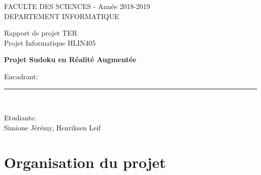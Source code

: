\documentclass[8pt, french]{article}
\begin{document}
\begin{titlepage}

\begin{center}
\vspace*{-1in}
\begin{figure}[htb]
\begin{center}
\end{center}
\end{figure}

FACULTE DES SCIENCES - Année 2018-2019\\
\vspace*{0.15in}
DEPARTEMENT INFORMATIQUE \\
\vspace*{0.4in}
\begin{large}
Rapport de projet TER \\
Projet Informatique HLIN405\\
\end{large}
\vspace*{0.2in}
\begin{Large}
\textbf{Projet Sudoku en Réalité Augmentée} \\
\end{Large}
\vspace*{0.3in}
\begin{large}
Encadrant:
 \\
\end{large}
\vspace*{0.3in}
\rule{80mm}{0.1mm}\\
\vspace*{0.1in}
\begin{large}
Etudiants: \\
Simione Jérémy, Henriksen Leif \\
 
\end{large}
\end{center}
\end{titlepage}

\newcommand{\CC}{C\nolinebreak\hspace{-.05em}\raisebox{.4ex}{\tiny\bf +}\nolinebreak\hspace{-.10em}\raisebox{.4ex}{\tiny\bf +}}
\def\CC{{C\nolinebreak[4]\hspace{-.05em}\raisebox{.4ex}{\tiny\bf ++}}}

\tableofcontents
\newpage
\section{Organisation du projet}
\end{document}
